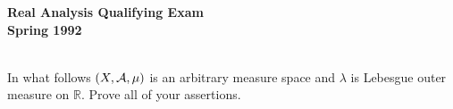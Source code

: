 \documentclass{article}
\def\R{\mathbb R}
\begin{document}






\begin{center}\begin{LARGE}
{\bf Real Analysis Qualifying Exam}\\ 
{\bf Spring 1992}\\ \end{LARGE}
\end{center}
\vspace{0.1in}
\noindent\hrulefill\\

In what follows $(X, {\cal A}, \mu)$ is an arbitrary measure space and
$\lambda$ is Lebesgue outer measure on $\R$. Prove all of your assertions.
\end{document}
